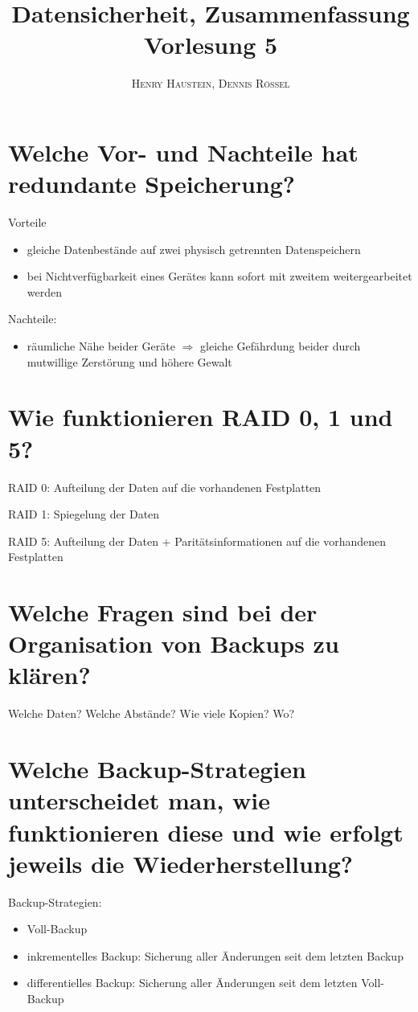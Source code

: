 \documentclass{article}
\title{\textbf{Datensicherheit, Zusammenfassung Vorlesung 5}}
\author{\textsc{Henry Haustein}, \textsc{Dennis Rössel}}
\date{}
\begin{document}
	\maketitle
	
	\section*{Welche Vor- und Nachteile hat redundante Speicherung?}
	Vorteile
	\begin{itemize}
		\item gleiche Datenbestände auf zwei physisch getrennten Datenspeichern
		\item bei Nichtverfügbarkeit eines Gerätes kann sofort mit zweitem weitergearbeitet werden
	\end{itemize}
	
	Nachteile:
	\begin{itemize}
		\item räumliche Nähe beider Geräte $\Rightarrow$ gleiche Gefährdung beider durch mutwillige Zerstörung und höhere Gewalt
	\end{itemize}
	
	\section*{Wie funktionieren RAID 0, 1 und 5?}
	RAID 0: Aufteilung der Daten auf die vorhandenen Festplatten
	
	RAID 1: Spiegelung der Daten
	
	RAID 5: Aufteilung der Daten + Paritätsinformationen auf die vorhandenen Festplatten
	
	\section*{Welche Fragen sind bei der Organisation von Backups zu klären?}
	Welche Daten? Welche Abstände? Wie viele Kopien? Wo?
	
	\section*{Welche Backup-Strategien unterscheidet man, wie funktionieren diese und wie erfolgt jeweils die Wiederherstellung?}
	Backup-Strategien:
	\begin{itemize}
		\item Voll-Backup
		\item inkrementelles Backup: Sicherung aller Änderungen seit dem letzten Backup
		\item differentielles Backup: Sicherung aller Änderungen seit dem letzten Voll-Backup
	\end{itemize}
	
\end{document}
